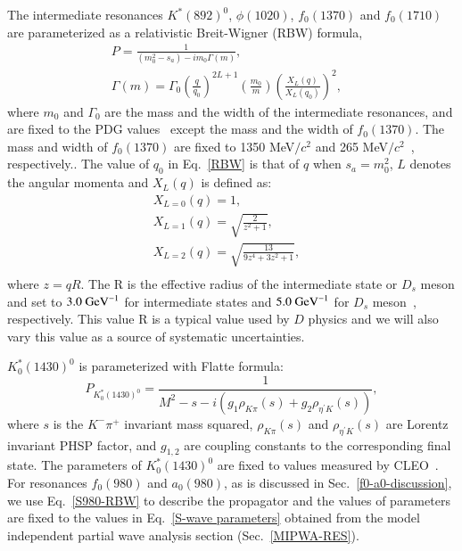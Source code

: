 {{        The intermediate resonances $K^{*}(892)^{0}$, $\phi(1020)$, $f_{0}(1370)$ and  $f_{0}(1710)$ are parameterized as a relativistic Breit-Wigner (RBW) formula,
        \begin{equation}
            \begin{array}{lr}
                P = \frac{1}{(m_{0}^{2} - s_{a} ) - im_{0}\Gamma(m)}, &\\
                \Gamma(m) = \Gamma_{0}\left(\frac{q}{q_{0}}\right)^{2L+1}\left(\frac{m_{0}}{m}\right)\left(\frac{X_{L}(q)}{X_{L}(q_{0})}\right)^{2}, &
            \end{array}\label{RBW} 
        \end{equation}
        where $m_{0}$ and $\Gamma_{0}$ are the mass and the width of the intermediate resonances, and are fixed to the PDG values~\cite{PDG2018} except the mass and the width of $f_{0}(1370)$. 
        The mass and width of $f_{0}(1370)$ are fixed to 1350 MeV$/c^{2}$ and 265 MeV$/c^{2}$~\cite{para-f01370}, respectively..
        The value of $q_{0}$ in Eq.~\ref{RBW} is that of $q$ when $s_{a}=m_{0}^{2}$, $L$ denotes the angular momenta and $X_{L}(q)$ is defined as:
        \begin{equation}
            \begin{array}{lr}
                X_{L=0}(q) = 1,       &\\
                X_{L=1}(q) = \sqrt{\frac{2}{z^{2}+1}},       &\\
                X_{L=2}(q) = \sqrt{\frac{13}{9z^{4}+3z^{2}+1}},       &\\
            \end{array}\label{XLQ} 
        \end{equation}
        where $z=qR$. The R is the effective radius of the intermediate state or $D_{s}$ meson and set to $3.0\ {\rm GeV}^{-1}$ for intermediate states and $5.0\ {\rm GeV}^{-1}$  for $D_{s}$ meson~\cite{Doc-DB-416-v30}, respectively.
        This value R is a typical value used by $D$ physics and we will also vary this value as a source of systematic uncertainties.

        $K^{*}_{0}(1430)^{0}$ is parameterized with Flatte formula:
        \begin{equation}
            P_{K^{*}_{0}(1430)^{0}}= \frac{1}{M^{2} - s - i(g_{1}\rho_{K\pi}(s) + g_{2}\rho_{\eta^{'}K}(s))}, \label{Flatte}
        \end{equation}
        where $s$ is the $K^{-}\pi^{+}$ invariant mass squared,  $\rho_{K\pi}(s)$ and $\rho_{\eta^{'}K}(s)$ are Lorentz invariant PHSP factor, and   $g_{1,2}$ are coupling constants to the corresponding final state. The parameters of $K^{*}_{0}(1430)^{0}$ are fixed to values measured by CLEO~\cite{CLEO-Flatte}. 
        For resonances $f_{0}(980)$ and $a_{0}(980)$, as is discussed in Sec.~\ref{f0-a0-discussion}, we use Eq.~\ref{S980-RBW} to describe the propagator and the values of parameters are fixed to the values in Eq.~\ref{S-wave parameters} obtained from the model independent partial wave analysis section (Sec.~\ref{MIPWA-RES}).
    }

}
